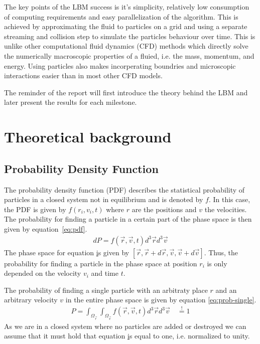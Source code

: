\documentclass[a4paper,11pt, oneside]{book}
\begin{document}
The key points of the LBM success is it's simplicity, relatively low consumption of computing requirements and easy parallelization of the algorithm.
This is achieved by approximating the fluid to particles on a grid and using a separate streaming and collision step to simulate the particles behaviour over time.
This is unlike other computational fluid dynamics (CFD) methods which directly solve the numerically macroscopic properties of a fluied, i.e. the mass, momentum, and energy.
Using particles also makes incorperating boundries and microscopic interactions easier than in most other CFD models.

The reminder of the report will first introduce the theory behind the LBM and later present the results for each milestone.

\chapter{Theoretical background}
\section{Probability Density Function}
The probability density function (PDF) describes the statistical probability of particles in a closed system not in equilibrium and is denoted by $f$.
In this case, the PDF is given by $f(r_i,v_i,t)$ where $r$ are the positions and $v$ the velocities.
The probability for finding a particle in a certain part of the phase space is then given by equation~\ref{eq:pdf}.
\begin{equation}
  \label{eq:pdf}
  \begin{aligned}
    dP = f(\vec{r},\vec{v},t) d^{3}\vec{r} d^{3}\vec{v}
  \end{aligned}
\end{equation}
The phase space for equation \href{eq:pdf} is given by $[\vec{r}, \vec{r}+d\vec{r}, \vec{v}, \vec{v}+d\vec{v}]$.
Thus, the probability for finding a particle in the phase space at position $r_i$ is only depended on the velocity $v_i$ and time $t$.

The probability of finding a single particle with an arbitraty place $r$ and an arbitrary velocity $v$ in the entire phase space is given by equation \ref{eq:prob-single}.
\begin{equation}
  \label{eq:prob-single}
  \begin{aligned}
    P = \int_{\Omega_{\vec{r}}} \int_{\Omega_{\vec{v}}}  f(\vec{r},\vec{v},t) d^{3}\vec{r} d^{3}\vec{v} \quad \overset{!}{=} 1
  \end{aligned}
\end{equation}
As we are in a closed system where no particles are added or destroyed we can assume that it must hold that equation \href{eq:prob-single} is equal to one, i.e. normalized to unity.
\end{document}
